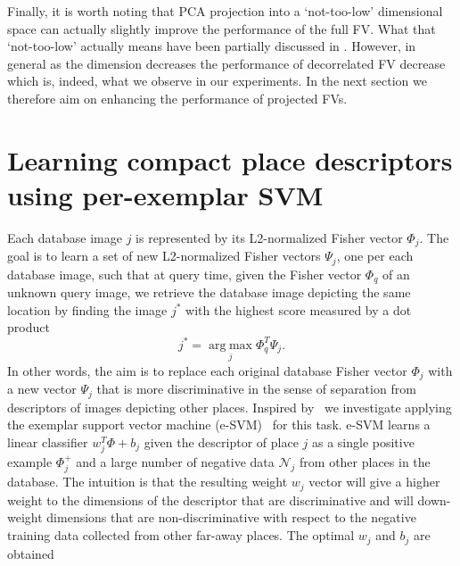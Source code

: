 \documentclass[table]{article} %
\begin{document}
			Finally, it is worth noting that PCA projection into a `not-too-low' dimensional space can actually slightly improve the performance of the full FV. What that `not-too-low' actually means have been partially discussed in \cite{Jegou2012HAL}. However, in general as the dimension decreases the performance of decorrelated FV decrease which is, indeed, what we observe in our experiments. In the next section we therefore aim on enhancing the performance of projected FVs.   


\section{Learning compact place descriptors using per-exemplar SVM}
\label{sec:perExemplar}
	Each database image $j$ is represented by its L2-normalized Fisher vector $\Phi_j$. The goal is to learn a set of new L2-normalized Fisher vectors $\Psi_j$, one per each database image, such that at query time, given the Fisher vector $\Phi_q$ of an unknown query image, we retrieve the database image depicting the same location by finding the image $j^*$ with the highest score measured by a dot product
	\begin{equation}
	    j^*=\operatorname*{arg\;max}_{j} \Phi_q^T \Psi_j. 
	    \label{eq:class}
	\end{equation}
	In other words, the aim is to replace each original database Fisher vector $\Phi_j$ with a new vector $\Psi_j$ that is more discriminative in the sense of separation from descriptors of images depicting other places. 
	Inspired by~\cite{Gronat2013} we investigate applying the exemplar support vector machine (e-SVM)~\cite{} for this task. 
	e-SVM learns a linear classifier $w_j^T\Phi+b_j$ given the descriptor of place $j$ as a single positive example $\Phi_j^+$ and a large number of negative data $\mathcal N_j$ from other places in the database.
	The intuition is that the resulting weight $w_j$ vector will give a higher weight to the dimensions of the descriptor that are discriminative and will down-weight dimensions that are non-discriminative with respect to the negative training data collected from other far-away places.  The optimal $w_j$ and $b_j$ are obtained
\end{document}
